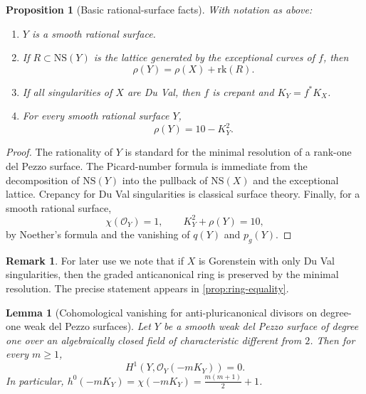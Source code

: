 \documentclass[11pt]{article}
\newtheorem{proposition}[proposition]{Proposition}
\newtheorem{lemma}[lemma]{Lemma}
\theoremstyle{definition}
\newtheorem{remark}[remark]{Remark}
\newcommand{\NS}{\mathrm{NS}}
\newcommand{\rk}{\mathrm{rk}}
\begin{document}
\begin{proposition}[Basic rational-surface facts]\label{prop:basic}
With notation as above:
\begin{enumerate}[label=\textup{(\roman*)}]
\item $Y$ is a smooth rational surface.
\item If $R\subset \NS(Y)$ is the lattice generated by the exceptional curves of $f$, then
\[
\rho(Y)=\rho(X)+\rk(R).
\]
\item If all singularities of $X$ are Du Val, then $f$ is crepant and $K_Y=f^*K_X$.
\item For every smooth rational surface $Y$,
\[
\rho(Y)=10-K_Y^2.
\]
\end{enumerate}
\end{proposition}

\begin{proof}
The rationality of $Y$ is standard for the minimal resolution of a rank-one del Pezzo surface. The Picard-number formula is immediate from the decomposition of $\NS(Y)$ into the pullback of $\NS(X)$ and the exceptional lattice. Crepancy for Du Val singularities is classical surface theory. Finally, for a smooth rational surface,
\[
\chi(\mathcal O_Y)=1,
\qquad
K_Y^2+\rho(Y)=10,
\]
by Noether's formula and the vanishing of $q(Y)$ and $p_g(Y)$.
\end{proof}

\begin{remark}
For later use we note that if $X$ is Gorenstein with only Du Val singularities, then the graded anticanonical ring is preserved by the minimal resolution. The precise statement appears in \cref{prop:ring-equality}.
\end{remark}

\begin{lemma}[Cohomological vanishing for anti-pluricanonical divisors on degree-one weak del Pezzo surfaces]\label{lem:vanishing}
Let $Y$ be a smooth weak del Pezzo surface of degree one over an algebraically closed field of characteristic different from $2$. Then for every $m\ge 1$,
\[
H^1(Y,\mathcal O_Y(-mK_Y))=0.
\]
In particular, $h^0(-mK_Y)=\chi(-mK_Y)=\frac{m(m+1)}{2}+1$.
\end{lemma}
\end{document}
